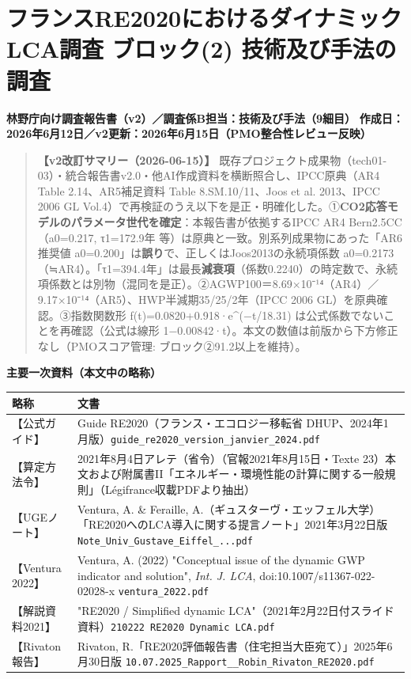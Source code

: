 \hypertarget{ux30d5ux30e9ux30f3ux30b9re2020ux306bux304aux3051ux308bux30c0ux30a4ux30caux30dfux30c3ux30aflcaux8abfux67fb-ux30d6ux30edux30c3ux30af2-ux6280ux8853ux53caux3073ux624bux6cd5ux306eux8abfux67fb}{%
\section{フランスRE2020におけるダイナミックLCA調査 ブロック(2)
技術及び手法の調査}\label{ux30d5ux30e9ux30f3ux30b9re2020ux306bux304aux3051ux308bux30c0ux30a4ux30caux30dfux30c3ux30aflcaux8abfux67fb-ux30d6ux30edux30c3ux30af2-ux6280ux8853ux53caux3073ux624bux6cd5ux306eux8abfux67fb}}

\textbf{林野庁向け調査報告書（v2）／調査係B担当：技術及び手法（9細目）}
\textbf{作成日：2026年6月12日／v2更新：2026年6月15日（PMO整合性レビュー反映）}

\begin{quote}
\textbf{【v2改訂サマリー（2026-06-15）】}
既存プロジェクト成果物（tech01-03）・統合報告書v2.0・他AI作成資料を横断照合し、IPCC原典（AR4
Table 2.14、AR5補足資料 Table 8.SM.10/11、Joos et al. 2013、IPCC 2006 GL
Vol.4）で再検証のうえ以下を是正・明確化した。①\textbf{CO2応答モデルのパラメータ世代を確定}：本報告書が依拠するIPCC
AR4 Bern2.5CC（a0=0.217, τ1=172.9年
等）は原典と一致。別系列成果物にあった「AR6推奨値
a0=0.200」は\textbf{誤り}で、正しくはJoos2013の永続項係数
a0=0.2173（≒AR4）。「τ1=394.4年」は最長\textbf{減衰項}（係数0.2240）の時定数で、永続項係数とは別物（混同を是正）。②AGWP100＝8.69×10⁻¹⁴（AR4）／9.17×10⁻¹⁴（AR5）、HWP半減期35/25/2年（IPCC
2006 GL）を原典確認。③指数関数形 f(t)=0.0820+0.918·e\^{}(−t/18.31)
は公式係数でないことを再確認（公式は線形
1−0.00842·t）。本文の数値は前版から下方修正なし（PMOスコア管理:
ブロック②91.2以上を維持）。
\end{quote}

\textbf{主要一次資料（本文中の略称）}

\begin{longtable}[]{@{}ll@{}}
\toprule
略称 & 文書\tabularnewline
\midrule
\endhead
【公式ガイド】 & Guide RE2020（フランス・エコロジー移転省
DHUP、2024年1月版）\texttt{guide\_re2020\_version\_janvier\_2024.pdf}\tabularnewline
【算定方法令】 & 2021年8月4日アレテ（省令）（官報2021年8月15日・Texte
23）本文および附属書II「エネルギー・環境性能の計算に関する一般規則」（Légifrance収載PDFより抽出）\tabularnewline
【UGEノート】 & Ventura, A. \& Feraille,
A.（ギュスターヴ・エッフェル大学）「RE2020へのLCA導入に関する提言ノート」2021年3月22日版
\texttt{Note\_Univ\_Gustave\_Eiffel\_...pdf}\tabularnewline
【Ventura 2022】 & Ventura, A. (2022) "Conceptual issue of the dynamic
GWP indicator and solution", \emph{Int. J. LCA},
doi:10.1007/s11367-022-02028-x \texttt{ventura\_2022.pdf}\tabularnewline
【解説資料2021】 & "RE2020 / Simplified dynamic
LCA"（2021年2月22日付スライド資料）\texttt{210222\ RE2020\ Dynamic\ LCA.pdf}\tabularnewline
【Rivaton報告】 & Rivaton,
R.「RE2020評価報告書（住宅担当大臣宛て）」2025年6月30日版
\texttt{10.07.2025\_Rapport\_\_Robin\_Rivaton\_RE2020.pdf}\tabularnewline
\bottomrule
\end{longtable}

